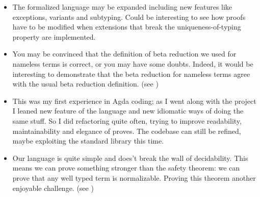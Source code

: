 \documentclass{article}
\begin{document}
\begin{itemize}
  \item
  The formalized language may be expanded including new features like exceptions, variants and subtyping.
  Could be interesting to see how proofs have to be modified when extensions that break the uniqueness-of-typing property are implemented.
  
  \item
  You may be convinced that the definition of beta reduction we used for nameless terms is correct, or you may have some doubts.
  Indeed, it would be interesting to demonstrate that the beta reduction for nameless terms agree with the usual beta reduction definition.
  (see \cite[Ex.\ 6.2.8]{pierce})
  
  \item
  This was my first experience in Agda coding; as I went along with the project I leaned new feature of the language and new idiomatic ways of doing the same stuff.
  So I did refactoring quite often, trying to improve readability, maintainability and elegance of proves.
  The codebase can still be refined, maybe exploiting the standard library this time.
  
  \item
  Our language is quite simple and does't break the wall of decidability.
  This means we can prove something stronger than the safety theorem: we can prove that any well typed term is normalizable.
  Proving this theorem another enjoyable challenge.
  (see \cite[Ch.\ 12]{pierce})
  
\end{itemize}



\newpage
\nocite{*}
\printbibliography
\end{document}
